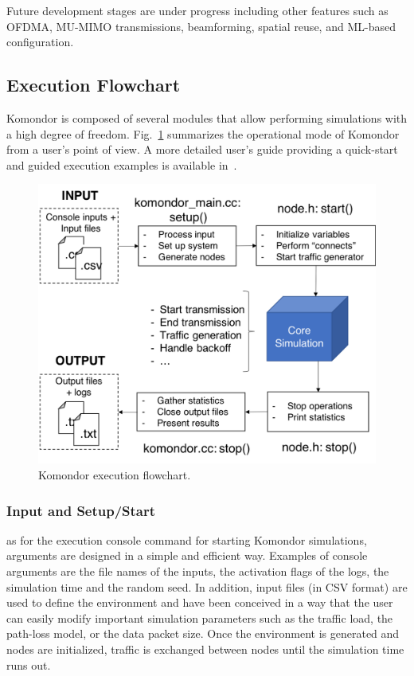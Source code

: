 \documentclass[conference]{IEEEtran}
\begin{document}
	Future development stages are under progress including other features such as OFDMA, MU-MIMO transmissions, beamforming, spatial reuse, and ML-based configuration.
	
	\subsection{Execution Flowchart}
	\label{subsection:flowchart}
	Komondor is composed of several modules that allow performing simulations with a high degree of freedom. Fig.~\ref{fig:komondor_flowchart} summarizes the operational mode of Komondor from a user's point of view. A more detailed user's guide providing a quick-start and guided execution examples is available in~\cite{komondor_guide2018}.
	
	\begin{figure}[t]
		\centering
		\includegraphics[width=0.9\columnwidth]{komondor_flowchart_helvetica.png}
		\caption{Komondor execution flowchart.}
		\label{fig:komondor_flowchart}
	\end{figure}		
	
	\subsubsection{Input and Setup/Start}
	as for the execution console command for starting Komondor simulations, arguments are designed in a simple and efficient way. Examples of console arguments are the file names of the inputs, the activation flags of the logs, the simulation time and the random seed. In addition, input files (in CSV format) are used to define the environment and have been conceived in a way that the user can easily modify important simulation parameters such as the traffic load, the path-loss model, or the data packet size.
	Once the environment is generated and nodes are initialized, traffic is exchanged between nodes until the simulation time runs out.
	
\end{document}
